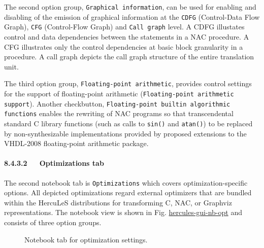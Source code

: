 \documentclass[a4paper]{article}
\begin{document}
The second option group, \texttt{Graphical information}, can be used for enabling and disabling of the emission of graphical information at the \texttt{CDFG} (Control-Data Flow Graph), \texttt{CFG} (Control-Flow Graph) and \texttt{Call graph} level. A CDFG illustates control and data dependencies between the statements in a NAC procedure. A CFG illustrates only the control dependencies at basic block granularity in a procedure. A call graph depicts the call graph structure of the entire translation unit.

The third option group, \texttt{Floating-point arithmetic}, provides control settings for the support of floating-point arithmetic (\texttt{Floating-point arithmetic support}). Another checkbutton, \texttt{Floating-point builtin algorithmic functions} enables the rewriting of NAC programs so that transcendental standard C library functions (such as calls to \texttt{sin()} and \texttt{atan()}) to be replaced by non-synthesizable implementations provided by proposed extensions to the VHDL-2008 floating-point arithmetic package.


\paragraph{8.4.3.2~~~Optimizations tab%
  \label{optimizations-tab}%
}

The second notebook tab is \texttt{Optimizations} which covers optimization-specific options. All depicted optimizations regard external optimizers that are bundled within the HercuLeS distributions for transforming C, NAC, or Graphviz representations. The notebook view is shown in Fig. \hyperref[hercules-gui-nb-opt]{hercules-gui-nb-opt} and consists of three option groups.
\begin{figure}
\label{hercules-gui-nb-opt}
\noindent{}
\caption{Notebook tab for optimization settings.}
\end{figure}
\end{document}
